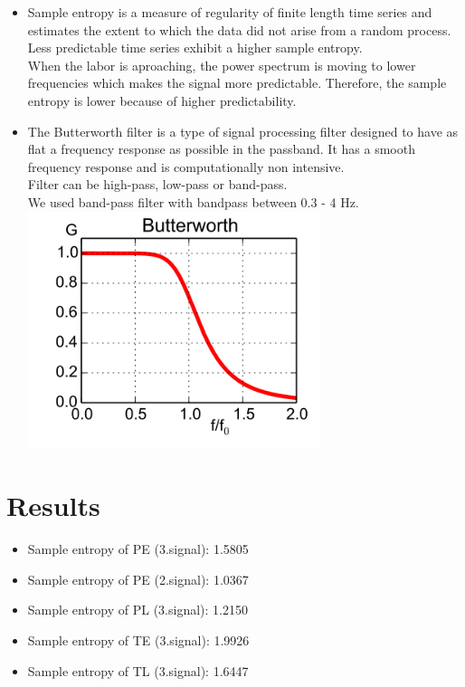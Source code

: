 \documentclass[a4paper,10pt]{article}
\begin{document}
\begin{itemize}
\item{Sample entropy is a measure of regularity of finite length time series and estimates the extent to which the data did not arise from a random process. Less predictable time series exhibit a higher sample entropy. \\  When the labor is aproaching, the power spectrum is moving to lower frequencies which makes the signal more predictable. Therefore, the sample entropy is lower because of higher predictability.}
\item{The Butterworth filter is a type of signal processing filter designed to have as flat a frequency response as possible in the passband. It has a smooth frequency response
and is computationally non intensive.\\ Filter can be high-pass, low-pass or band-pass. \\
We used band-pass filter with bandpass between 0.3 - 4 Hz.}
\includegraphics{butter}
\end{itemize}

\section {Results}

\begin{itemize}
\item{Sample entropy of PE (3.signal): 1.5805}
\item{Sample entropy of PE (2.signal): 1.0367}
\item{Sample entropy of PL (3.signal): 1.2150}
\item{Sample entropy of TE (3.signal): 1.9926}
\item{Sample entropy of TL (3.signal): 1.6447}
\end{itemize}
\end{document}
